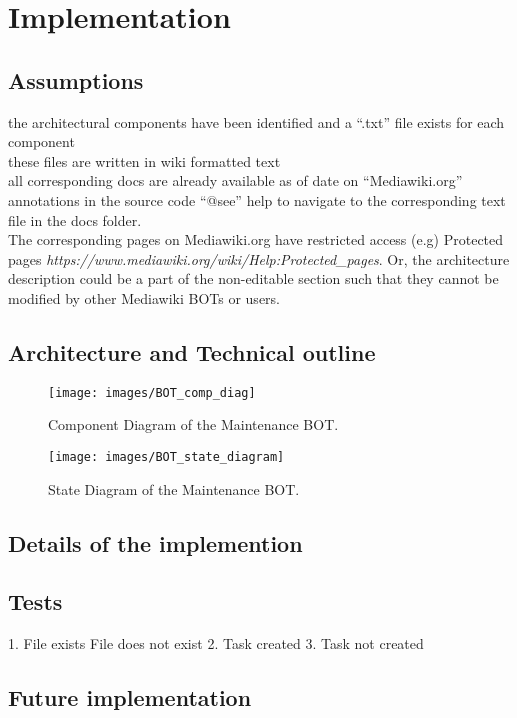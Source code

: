 \chapter{Implementation}\label{chapter:Implementation}

\section{Assumptions}
\indent the architectural components have been identified and a \enquote{.txt} file exists for each component
\\\indent these files are written in wiki formatted text
\\\indent all corresponding docs are already available as of date on  \enquote{Mediawiki.org}
\\\indent annotations in the source code \enquote{@see} help to navigate to the corresponding text file in the docs folder.
\\\indent The corresponding pages on Mediawiki.org have restricted access (e.g) Protected pages \emph{https://www.mediawiki.org/wiki/Help:Protected\_pages}. Or, the architecture description could be a part of the non-editable section such that they cannot be modified by other Mediawiki BOTs or users.
\section{Architecture and Technical outline}

\begin{figure}[H]
  \centering
  \texttt{[image: images/BOT\_comp\_diag]}
  \caption[Component Diagram of the Maintenance BOT]{Component Diagram of the Maintenance BOT.}\label{fig:BOT_comp_diag}
\end{figure}


\begin{figure}[H]
  \centering
  \texttt{[image: images/BOT\_state\_diagram]}
  \caption[State Diagram of the Maintenance BOT]{State Diagram of the Maintenance BOT.}\label{fig:BOT_comp_diag}
\end{figure}

\section{Details of the implemention}

\section{Tests}
1. File exists
File does not exist
2. Task created
3. Task not created

\section{Future implementation}

		

